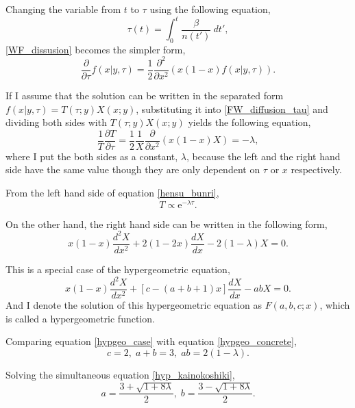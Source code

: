 \documentclass[12pt]{article}
\newcommand{\napier}{\mathrm{e}}
\newcommand{\bibun}[2]{\frac{d {#1}}{d {#2}}}
\newcommand{\henbibun}[2]{\frac{\partial {#1}}{\partial {#2}}}
\newcommand{\equationref}[1]{equation \eqref{#1}}
\begin{document}
Changing the variable from $t$ to $\tau$ using the following equation,
\begin{equation}
 \tau(t) = \int_{0}^{t} \frac{\beta}{n(t')} \: dt',
\end{equation}
\eqref{WF_dissusion} becomes the simpler form,
\begin{equation}
 \henbibun{}{\tau} f(x|y,\tau) = \frac{1}{2} \frac{\partial^2}{\partial x^2} \left( x(1-x) f(x|y,\tau) \right).\label{FW_diffusion_tau}
\end{equation}

If I assume that the solution can be written in the separated form $f(x|y,\tau) = T(\tau;y) X(x;y)$,
substituting it into \eqref{FW_diffusion_tau} and dividing both sides with $T(\tau;y) X(x;y)$ yields the following equation,
\begin{equation}
 \frac{1}{T}\henbibun{T}{\tau} = \frac{1}{2}\frac{1}{X}\henbibun{}{x^2} \left( x(1-x) X \right) = -\lambda,\label{hensu_bunri}
\end{equation}
where I put the both sides as a constant, $\lambda$, because the left and the right hand side have the same value though they are only dependent on $\tau$ or $x$ respectively.

From the left hand side of \equationref{hensu_bunri},
\begin{equation}
 T \propto \napier^{-\lambda \tau}.
\end{equation}

On the other hand, the right hand side can be written in the following form,
\begin{equation}
 x(1-x)\frac{d^2 X}{d x^2} + 2(1-2x) \bibun{X}{x} - 2(1 - \lambda) X = 0.\label{hypgeo_case}
\end{equation}

This is a special case of the hypergeometric equation,
\begin{equation}
 x(1-x)\frac{d^2 X}{d x^2} + \left[ c - (a+b+1)x \right] \bibun{X}{x} - ab X = 0.\label{hypgeo_concrete}
\end{equation}
And I denote the solution of this hypergeometric equation as $F(a, b, c; x)$, which is called a hypergeometric function.

Comparing \equationref{hypgeo_case} with \equationref{hypgeo_concrete},
\begin{equation}
 c = 2, \; a+b = 3, \; ab = 2(1-\lambda).\label{hyp_kainokoshiki}
\end{equation}

Solving the simultaneous equation \eqref{hyp_kainokoshiki},
\begin{equation}
 a = \frac{3 + \sqrt{1 + 8\lambda}}{2}, \; b = \frac{3 - \sqrt{1 + 8\lambda}}{2}.\label{a_b_solution}
\end{equation}
\end{document}
